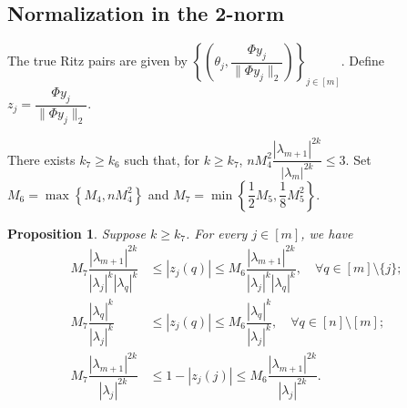 \documentclass[11pt,a4paper]{article}
\theoremstyle{plain}              %
\newtheorem{proposition}[theorem]{Proposition}
\theoremstyle{definition}         %
\begin{document}
\subsection{Normalization in the 2-norm}

The true Ritz pairs are given by \(\left\{\left(\theta_j,\dfrac{\Phi y_j}{\|\Phi y_j\|_2}\right)\right\}_{j\in[m]}\). Define \(z_j=\dfrac{\Phi y_j}{\|\Phi y_j\|_2}\).

There exists \(k_7\geq k_6\) such that, for \(k\geq k_7\), \(nM_4^2\dfrac{|\lambda_{m+1}|^{2k}}{|\lambda_m|^{2k}}\leq 3\). Set \(M_6=\max\left\{M_4,nM_4^2\right\}\) and \(M_7=\min\left\{\dfrac{1}{2}M_5,\dfrac{1}{8}M_5^2\right\}\).

\begin{proposition}
Suppose \(k\geq k_7\). For every \(j\in[m]\), we have
\begin{align*}
M_7\dfrac{|\lambda_{m+1}|^{2k}}{|\lambda_j|^k|\lambda_q|^k}&\leq|z_j(q)|\leq M_6\dfrac{|\lambda_{m+1}|^{2k}}{|\lambda_j|^k|\lambda_q|^k},\quad\forall q\in[m]\setminus\{j\};\\
M_7\dfrac{|\lambda_q|^k}{|\lambda_j|^k}&\leq|z_j(q)|\leq M_6\dfrac{|\lambda_q|^k}{|\lambda_j|^k},\quad\forall q\in[n]\setminus[m];\\
M_7\dfrac{|\lambda_{m+1}|^{2k}}{|\lambda_j|^{2k}}&\leq1-|z_j(j)|\leq M_6\dfrac{|\lambda_{m+1}|^{2k}}{|\lambda_j|^{2k}}.
\end{align*}
\end{proposition}
\end{document}
